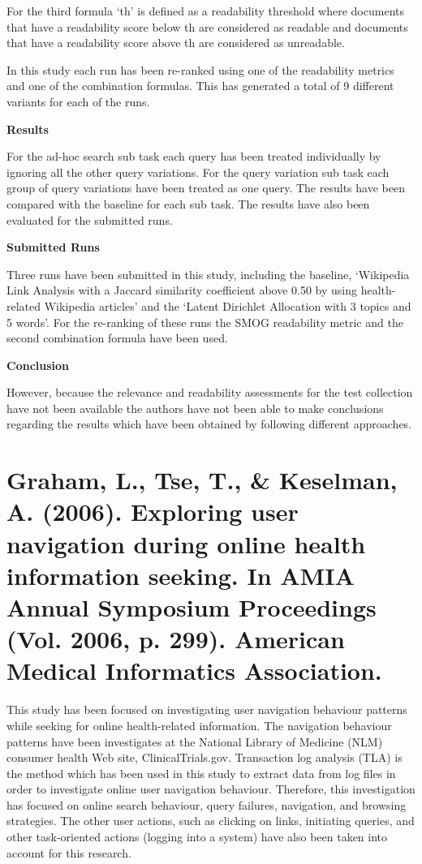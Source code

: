 \documentclass[]{article}
\begin{document}
For the third formula ‘th’ is defined as a readability threshold where documents that have a readability score below th are considered as readable and documents that have a readability score above th are considered as unreadable.

In this study each run has been re-ranked using one of the readability metrics and one of the combination formulas. This has generated a total of 9 different variants for each of the runs.

\textbf{Results}

For the ad-hoc search sub task each query has been treated individually by ignoring all the other query variations. For the query variation sub task each group of query variations have been treated as one query. The results have been compared with the baseline for each sub task. The results have also been evaluated for the submitted runs.  

\textbf{Submitted Runs}

Three runs have been submitted in this study, including the baseline, ‘Wikipedia Link Analysis with a Jaccard similarity coefficient above 0.50 by using health-related Wikipedia articles’ and the ‘Latent Dirichlet Allocation with 3 topics and 5 words’. For the re-ranking of these runs the SMOG readability metric and the second combination formula have been used. 

\textbf{Conclusion}

However, because the relevance and readability assessments for the test collection have not been available the authors have not been able to make conclusions regarding the results which have been obtained by following different approaches.   

\section{Graham, L., Tse, T., \& Keselman, A. (2006). Exploring user navigation during online health information seeking. In AMIA Annual Symposium Proceedings (Vol. 2006, p. 299). American Medical Informatics Association.}

This study has been focused on investigating user navigation behaviour patterns while seeking for online health-related information. The navigation behaviour patterns have been investigates at the National Library of Medicine (NLM) consumer health Web site, ClinicalTrials.gov. Transaction log analysis (TLA) is the method which has been used in this study to extract data from log files in order to investigate online user navigation behaviour. Therefore, this investigation has focused on online search behaviour, query failures, navigation, and browsing strategies. The other user actions, such as clicking on links, initiating queries, and other task-oriented actions (logging into a system) have also been taken into account for this research.     
\end{document}

